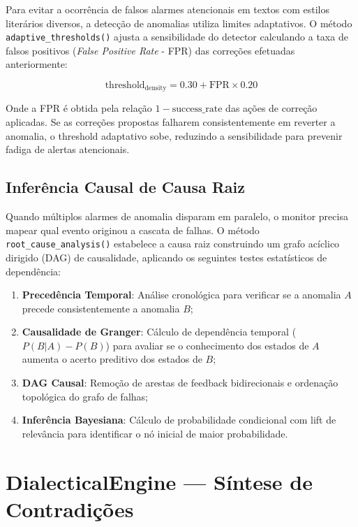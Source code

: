 \documentclass[12pt,a4paper,oneside]{abntex2}
\begin{document}
Para evitar a ocorrência de falsos alarmes atencionais em textos com estilos literários diversos, a detecção de anomalias utiliza limites adaptativos. O método \texttt{adaptive\_thresholds()} ajusta a sensibilidade do detector calculando a taxa de falsos positivos (\textit{False Positive Rate} - FPR) das correções efetuadas anteriormente:

\begin{equation}
\text{threshold}_{\text{density}} = 0.30 + \text{FPR} \times 0.20
\end{equation}

Onde a FPR é obtida pela relação $1 - \text{success\_rate}$ das ações de correção aplicadas. Se as correções propostas falharem consistentemente em reverter a anomalia, o threshold adaptativo sobe, reduzindo a sensibilidade para prevenir fadiga de alertas atencionais.

\subsection{Inferência Causal de Causa Raiz}

Quando múltiplos alarmes de anomalia disparam em paralelo, o monitor precisa mapear qual evento originou a cascata de falhas. O método \texttt{root\_cause\_analysis()} estabelece a causa raiz construindo um grafo acíclico dirigido (DAG) de causalidade, aplicando os seguintes testes estatísticos de dependência:

\begin{enumerate}
    \item \textbf{Precedência Temporal}: Análise cronológica para verificar se a anomalia $A$ precede consistentemente a anomalia $B$;
    \item \textbf{Causalidade de Granger}: Cálculo de dependência temporal ($P(B|A) - P(B)$) para avaliar se o conhecimento dos estados de $A$ aumenta o acerto preditivo dos estados de $B$;
    \item \textbf{DAG Causal}: Remoção de arestas de feedback bidirecionais e ordenação topológica do grafo de falhas;
    \item \textbf{Inferência Bayesiana}: Cálculo de probabilidade condicional com lift de relevância para identificar o nó inicial de maior probabilidade.
\end{enumerate}

\section{DialecticalEngine — Síntese de Contradições}
\end{document}
